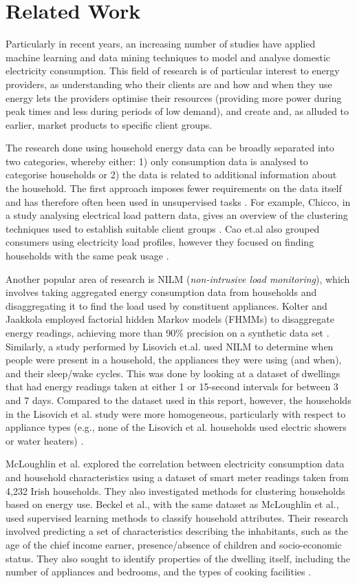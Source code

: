 \section{Related Work}
\label{sec:previousWork}
Particularly in recent years, an increasing number of studies have applied machine learning and data mining techniques to model and analyse domestic electricity consumption. This field of research is of particular interest to energy providers, as understanding who their clients are and how and when they use energy lets the providers optimise their resources (providing more power during peak times and less during periods of low demand), and create and, as alluded to earlier, market products to specific client groups.

The research done using household energy data can be broadly separated into two categories, whereby either: 1) only consumption data is analysed to categorise households or 2) the data is related to additional information about the household. The first approach imposes fewer requirements on the data itself and has therefore often been used in unsupervised tasks \cite{Beckel_3}. For example, Chicco, in a study analysing electrical load pattern data, gives an overview of the clustering techniques used to establish suitable client groups \cite{Chicco}. Cao et.al also grouped consumers using electricity load profiles, however they focused on finding households with the same peak usage \cite{Cao}. 

Another popular area of research is NILM (\textit{non-intrusive load monitoring}), which involves taking aggregated energy consumption data from households and disaggregating it to find the load used by constituent appliances. Kolter and Jaakkola employed factorial hidden Markov models (FHMMs) to disaggregate energy readings, achieving more than 90\% precision on a synthetic data set \cite{Kolter}. Similarly, a study performed by Lisovich et.al. used NILM to determine when people were present in a household, the appliances they were using (and when), and their sleep/wake cycles. This was done by looking at a dataset of dwellings that had energy readings taken at either 1 or 15-second intervals for between 3 and 7 days. Compared to the dataset used in this report, however, the households in the Lisovich et al. study were more homogeneous, particularly with respect to appliance types (e.g., none of the Lisovich et al. households used electric showers or water heaters) \cite{LMW}.

McLoughlin et al. explored the correlation between electricity consumption data and household characteristics using a dataset of smart meter readings taken from 4,232 Irish households. They also investigated methods for clustering households based on energy use. Beckel et al., with the same dataset as McLoughlin et al., used supervised learning methods to classify household attributes. Their research involved predicting a set of characteristics describing the inhabitants, such as the age of the chief income earner, presence/absence of children and socio-economic status. They also sought to identify properties of the dwelling itself, including the number of appliances and bedrooms, and the types of cooking facilities \cite{Beckel_3}. 

